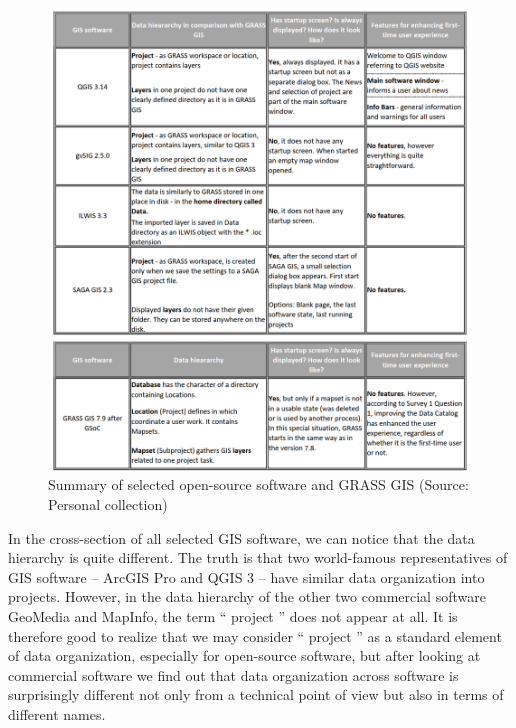 \documentclass[a4paper,10pt,twoside]{article}
\begin{document}
\vspace{0.3cm}
\begin{figure}[hbt!] 
\begin{center}
\includegraphics[width=15cm]{../pictures/open-source_software.png} 
\caption[Summary of selected open-source software and GRASS GIS]{Summary of selected open-source software and GRASS GIS (Source: Personal collection)}
\label{fig:open-source_software}
\end{center}
\end{figure}


\noindent In the cross-section of all selected GIS software, we can notice that the data hierarchy is quite different. The truth is that two world-famous representatives of GIS software -- ArcGIS Pro and QGIS 3 -- have similar data organization into projects. However, in the data hierarchy of the other two commercial software GeoMedia and MapInfo, the term `` project '' does not appear at all. It is therefore good to realize that we may consider `` project '' as a standard element of data organization, especially for open-source software, but after looking at commercial software we find out that data organization across software is surprisingly different not only from a technical point of view but also in terms of different names.
\end{document}

